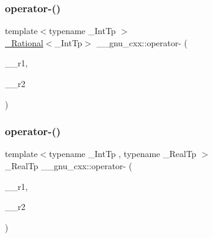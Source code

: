 \subsubsection{\texorpdfstring{operator-\/()}{operator-()}\hspace{0.1cm}{\footnotesize\ttfamily [2/4]}}
{\footnotesize\ttfamily template$<$typename \+\_\+\+Int\+Tp $>$ \\
\hyperlink{class____gnu__cxx_1_1__Rational}{\+\_\+\+Rational}$<$\+\_\+\+Int\+Tp$>$ \+\_\+\+\_\+gnu\+\_\+cxx\+::operator-\/ (\begin{DoxyParamCaption}\item[{const \hyperlink{class____gnu__cxx_1_1__Rational}{\+\_\+\+Rational}$<$ \+\_\+\+Int\+Tp $>$ \&}]{\+\_\+\+\_\+r1,  }\item[{const \hyperlink{class____gnu__cxx_1_1__Rational}{\+\_\+\+Rational}$<$ \+\_\+\+Int\+Tp $>$ \&}]{\+\_\+\+\_\+r2 }\end{DoxyParamCaption})}

\mbox{\label{namespace____gnu__cxx_a3dd5bda728b924db9cd825b6cf94696a}} 
\subsubsection{\texorpdfstring{operator-\/()}{operator-()}\hspace{0.1cm}{\footnotesize\ttfamily [3/4]}}
{\footnotesize\ttfamily template$<$typename \+\_\+\+Int\+Tp , typename \+\_\+\+Real\+Tp $>$ \\
\+\_\+\+Real\+Tp \+\_\+\+\_\+gnu\+\_\+cxx\+::operator-\/ (\begin{DoxyParamCaption}\item[{\+\_\+\+Real\+Tp}]{\+\_\+\+\_\+r1,  }\item[{const \hyperlink{class____gnu__cxx_1_1__Rational}{\+\_\+\+Rational}$<$ \+\_\+\+Int\+Tp $>$ \&}]{\+\_\+\+\_\+r2 }\end{DoxyParamCaption})}

\mbox{\label{namespace____gnu__cxx_a8da73d2b1445a4c343f126dde3f28013}} 
